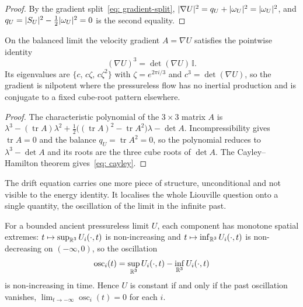 \begin{proof}
By the gradient split~\eqref{eq: gradient-split},
$\lvert \nabla U \rvert^2 = q_U + \lvert \omega_U \rvert^2 = \lvert \omega_U \rvert^2$, and
$q_U = \lvert S_U \rvert^2 - \tfrac12\lvert \omega_U \rvert^2 = 0$ is the second equality.
\end{proof}

\begin{lemma}\label{lem: cayley}
On the balanced limit the velocity gradient $A = \nabla U$ satisfies the pointwise
identity
\begin{equation}\label{eq: cayley}
  (\nabla U)^3 = \det(\nabla U)\,\mathbb{I}.
\end{equation}
Its eigenvalues are $\{c,\, c\zeta,\, c\zeta^2\}$ with $\zeta = e^{2\pi i/3}$ and
$c^3 = \det(\nabla U)$, so the gradient is nilpotent where the pressureless flow has
no inertial production and is conjugate to a fixed cube-root pattern elsewhere.
\end{lemma}

\begin{proof}
The characteristic polynomial of the $3\times3$ matrix $A$ is
$\lambda^3 - (\operatorname{tr}A)\lambda^2
 + \tfrac12\bigl((\operatorname{tr}A)^2 - \operatorname{tr}A^2\bigr)\lambda - \det A$.
Incompressibility gives $\operatorname{tr}A = 0$ and the balance
$q_U = \operatorname{tr}A^2 = 0$, so the polynomial reduces to $\lambda^3 - \det A$
and its roots are the three cube roots of $\det A$. The Cayley--Hamilton theorem
gives~\eqref{eq: cayley}.
\end{proof}

The drift equation carries one more piece of structure, unconditional and not
visible to the energy identity. It localises the whole Liouville question onto a
single quantity, the oscillation of the limit in the infinite past.

\begin{lemma}\label{lem: monotone}
For a bounded ancient pressureless limit $U$, each component has monotone spatial
extremes: $t\mapsto\sup_{\mathbb{R}^3}U_i(\cdot,t)$ is non-increasing and
$t\mapsto\inf_{\mathbb{R}^3}U_i(\cdot,t)$ is non-decreasing on $(-\infty,0)$, so the
oscillation
\begin{equation}\label{eq: osc}
  \operatorname{osc}_i(t)
  = \sup_{\mathbb{R}^3}U_i(\cdot,t) - \inf_{\mathbb{R}^3}U_i(\cdot,t)
\end{equation}
is non-increasing in time. Hence $U$ is constant if and only if the past
oscillation vanishes, $\lim_{t\to-\infty}\operatorname{osc}_i(t) = 0$ for each $i$.
\end{lemma}

